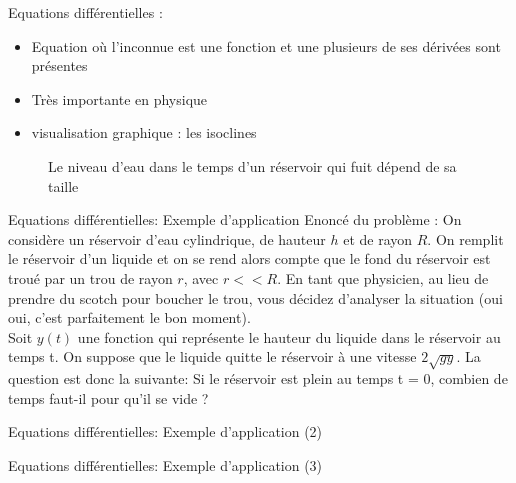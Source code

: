 \documentclass[xcolor=table]{beamer}
\begin{document}
\begin{frame}{Equations différentielles :}
\begin{itemize}
    
    \item  Equation où l'inconnue est une fonction et une plusieurs de ses dérivées sont présentes
    \item Très importante en physique
    \item visualisation graphique : les isoclines
    \end{itemize}
    
 \begin{figure}[H]
    \centering
    
    \caption{Le niveau d'eau dans le temps d'un réservoir qui fuit dépend de sa taille}
    \label{fig:my_label}

\end{figure}

    
\end{frame}
\begin{frame}{Equations différentielles: Exemple d'application}
Enoncé du problème : \newline
On considère un réservoir d'eau cylindrique, de hauteur $h$ et de rayon $R$. On remplit le réservoir d'un liquide et on se rend alors compte que le fond du réservoir est troué par un trou de rayon $r$, avec $r << R$. En tant que physicien, au lieu de prendre du scotch pour boucher le trou, vous décidez d'analyser la situation (oui oui, c'est parfaitement le bon moment). \\
Soit $y(t)$ une fonction qui représente le hauteur du liquide dans le réservoir au temps t. On suppose que le liquide quitte le réservoir à une vitesse $2\sqrt{gy}$. La question est donc la suivante: Si le réservoir est plein au temps t = 0, combien de temps faut-il pour qu'il se vide ?
    
\end{frame}
\begin{frame}{Equations différentielles: Exemple d'application (2)}
    
\end{frame}
\begin{frame}{Equations différentielles: Exemple d'application (3)}
    
\end{frame}
\end{document}
